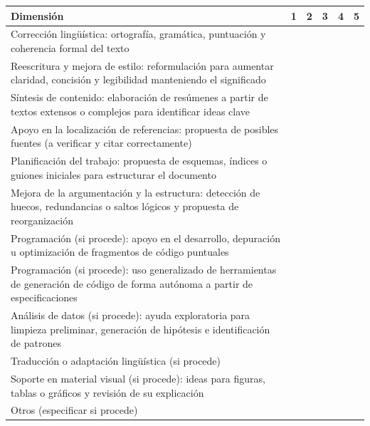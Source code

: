 \begin{center}
  \small
  \setlength{\tabcolsep}{0.3cm}
  \begin{longtable}{|p{11cm}|c|c|c|c|c|}
    \hline
    \textbf{Dimensión} & \textbf{1} & \textbf{2} & \textbf{3} & \textbf{4} & \textbf{5} \\
    \hline
    \endhead
    \hline
    \endfoot

    Corrección lingüística: ortografía, gramática, puntuación y coherencia formal del texto &  &  &  &  & \\
    \hline

    Reescritura y mejora de estilo: reformulación para aumentar claridad, concisión y legibilidad manteniendo el significado &  &  &  & &  \\
    \hline

    Síntesis de contenido: elaboración de resúmenes a partir de textos extensos o complejos para identificar ideas clave &  &  &  &  &  \\
    \hline

    Apoyo en la localización de referencias: propuesta de posibles fuentes (a verificar y citar correctamente) &  &  &  & & \\
    \hline

    Planificación del trabajo: propuesta de esquemas, índices o guiones iniciales para estructurar el documento &  &  &  &  &  \\
    \hline

    Mejora de la argumentación y la estructura: detección de huecos, redundancias o saltos lógicos y propuesta de reorganización &  &  &  &  &  \\
    \hline

    Programación (si procede): apoyo en el desarrollo, depuración u optimización de fragmentos de código puntuales &  &  &  &  &  \\
    \hline

    Programación (si procede): uso generalizado de herramientas de generación de código de forma autónoma a partir de especificaciones &  & &  &  &  \\
    \hline

    Análisis de datos (si procede): ayuda exploratoria para limpieza preliminar, generación de hipótesis e identificación de patrones &  &  &  &  &  \\
    \hline

    Traducción o adaptación lingüística (si procede) &  &  &  &  &  \\
    \hline

    Soporte en material visual (si procede): ideas para figuras, tablas o gráficos y revisión de su explicación &  &  &  &  &  \\
    \hline

    Otros (especificar si procede)  &  &  &  &  &  \\
    \hline

  \end{longtable}
\end{center}



